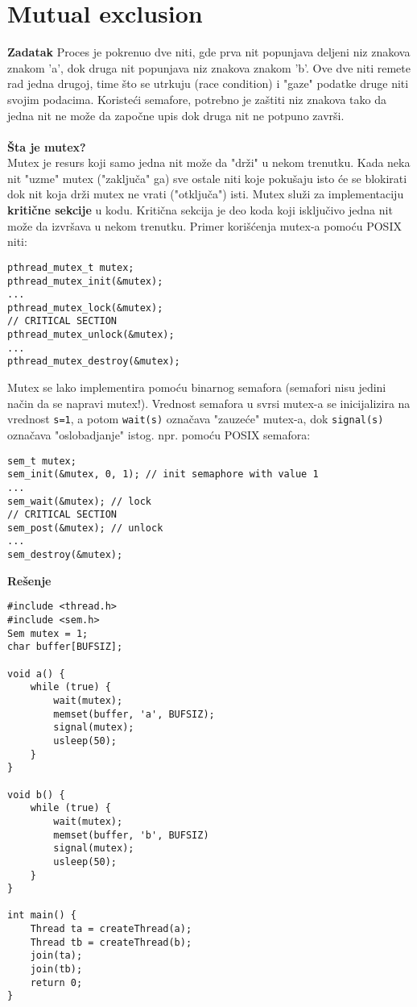 \clearpage
\section{Mutual exclusion}
\textbf{\large Zadatak} Proces je pokrenuo dve niti, gde prva nit popunjava deljeni niz znakova znakom 'a', dok druga nit popunjava niz znakova znakom 'b'. Ove dve niti remete rad jedna drugoj, time \v{s}to se utrkuju (race condition) i "gaze" podatke druge niti svojim podacima. Koriste\'{c}i semafore, potrebno je za\v{s}titi niz znakova tako da jedna nit ne mo\v{z}e da zapo\v{c}ne upis dok druga nit ne potpuno zavr\v{s}i.
\\\\
\textbf{\v{S}ta je mutex?}
\\
Mutex je resurs koji samo jedna nit mo\v{z}e da "dr\v{z}i" u nekom trenutku. Kada neka nit "uzme" mutex ("zaklju\v{c}a" ga) sve ostale niti koje poku\v{s}aju isto \'{c}e se blokirati dok nit koja dr\v{z}i mutex ne vrati ("otklju\v{c}a") isti. Mutex slu\v{z}i za implementaciju \textbf{kriti\v{c}ne sekcije} u kodu. Kriti\v{c}na sekcija je deo koda koji isklju\v{c}ivo jedna nit mo\v{z}e da izvr\v{s}ava u nekom trenutku. Primer kori\v{s}\'{c}enja mutex-a pomo\'{c}u POSIX niti:
\begin{lstlisting}
pthread_mutex_t mutex;
pthread_mutex_init(&mutex);
...
pthread_mutex_lock(&mutex);
// CRITICAL SECTION
pthread_mutex_unlock(&mutex);
...
pthread_mutex_destroy(&mutex);
\end{lstlisting}
Mutex se lako implementira pomo\'{c}u binarnog semafora (semafori nisu jedini na\v{c}in da se napravi mutex!). Vrednost semafora u svrsi mutex-a se inicijalizira na vrednost \texttt{s=1}, a potom \texttt{wait(s)} ozna\v{c}ava "zauze\'{c}e" mutex-a, dok \texttt{signal(s)} ozna\v{c}ava "oslobadjanje" istog.  npr. pomo\'{c}u POSIX semafora:
\begin{lstlisting}
sem_t mutex;
sem_init(&mutex, 0, 1); // init semaphore with value 1
...
sem_wait(&mutex); // lock
// CRITICAL SECTION
sem_post(&mutex); // unlock
...
sem_destroy(&mutex);
\end{lstlisting}
\textbf{\large Re\v{s}enje}
\begin{lstlisting}
#include <thread.h>
#include <sem.h>
Sem mutex = 1;
char buffer[BUFSIZ];

void a() {
    while (true) {
        wait(mutex);
		memset(buffer, 'a', BUFSIZ);
		signal(mutex);
        usleep(50);
    }
}

void b() {
    while (true) {
        wait(mutex);
		memset(buffer, 'b', BUFSIZ)
		signal(mutex);
        usleep(50);
    }
}

int main() {
    Thread ta = createThread(a);
    Thread tb = createThread(b);
    join(ta);
    join(tb);
    return 0;
}
\end{lstlisting}